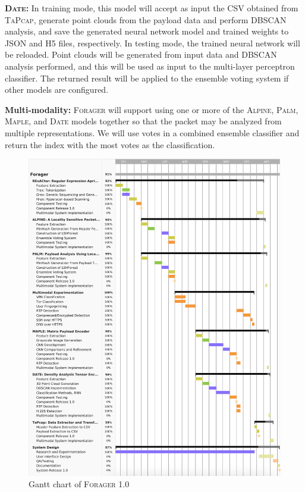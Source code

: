 \textbf{\textsc{Date}: } In training mode, this model will accept as input the CSV obtained from \textsc{TaPcap}, generate point clouds from the payload data and perform DBSCAN analysis, and save the generated neural network model and trained weights to JSON and H5 files, respectively. In testing mode, the trained neural network will be reloaded. Point clouds will be generated from input data and DBSCAN analysis performed, and this will be used as input to the multi-layer perceptron classifier. The returned result will be applied to the ensemble voting system if other models are configured.

\textbf{Multi-modality: } \textsc{Forager} will support using one or more of the \textsc{Alpine}, \textsc{Palm}, \textsc{Maple}, and \textsc{Date} models together so that the packet may be analyzed from multiple representations. We will use votes in a combined ensemble classifier and return the index with the most votes as the classification.


\begin{figure}
\includegraphics[width=\textwidth,height=\textheight]{chapters/expected/img/gantt.png}
\caption{Gantt chart of \textsc{Forager} 1.0}
\label{fig:gantt}
\end{figure}
